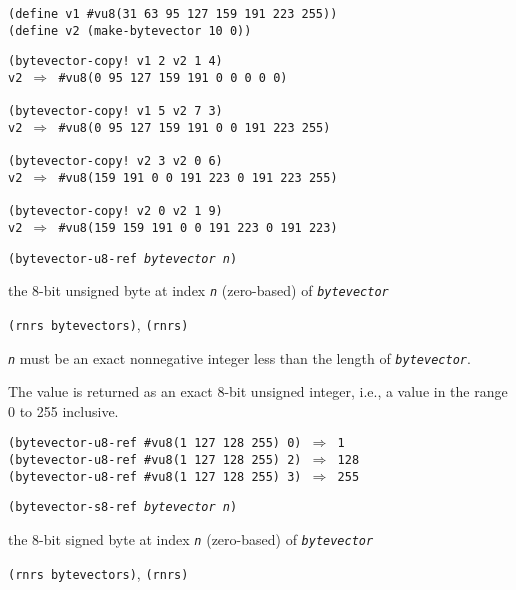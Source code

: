 \begin{alltt}
(define v1 \#{}vu8(31 63 95 127 159 191 223 255))
(define v2 (make-bytevector 10 0))

(bytevector-copy! v1 2 v2 1 4)
v2 \(\Rightarrow\) \#{}vu8(0 95 127 159 191 0 0 0 0 0)
 
(bytevector-copy! v1 5 v2 7 3)
v2 \(\Rightarrow\) \#{}vu8(0 95 127 159 191 0 0 191 223 255)
 
(bytevector-copy! v2 3 v2 0 6)
v2 \(\Rightarrow\) \#{}vu8(159 191 0 0 191 223 0 191 223 255)
 
(bytevector-copy! v2 0 v2 1 9)
v2 \(\Rightarrow\) \#{}vu8(159 159 191 0 0 191 223 0 191 223)
\end{alltt}

\begin{description}

\label{objects_s248}\item[procedure] \texttt{(bytevector-u8-ref \textit{bytevector} \textit{n})}



\item[returns] the 8-bit unsigned byte at index \texttt{\textit{n}} (zero-based) of \texttt{\textit{bytevector}} 


\item[libraries] \texttt{(rnrs bytevectors)}, \texttt{(rnrs)}
\end{description}

\texttt{\textit{n}} must be an exact nonnegative integer less than
the length of \texttt{\textit{bytevector}}.

The value is returned as an exact 8-bit unsigned integer, i.e., a value in
the range 0 to 255 inclusive.


\begin{alltt}
(bytevector-u8-ref \#{}vu8(1 127 128 255) 0) \(\Rightarrow\) 1
(bytevector-u8-ref \#{}vu8(1 127 128 255) 2) \(\Rightarrow\) 128
(bytevector-u8-ref \#{}vu8(1 127 128 255) 3) \(\Rightarrow\) 255
\end{alltt}

\begin{description}

\label{objects_s249}\item[procedure] \texttt{(bytevector-s8-ref \textit{bytevector} \textit{n})}



\item[returns] the 8-bit signed byte at index \texttt{\textit{n}} (zero-based) of \texttt{\textit{bytevector}} 


\item[libraries] \texttt{(rnrs bytevectors)}, \texttt{(rnrs)}
\end{description}

